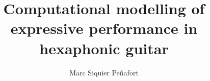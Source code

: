 




\title{Computational modelling of expressive performance in hexaphonic guitar}
\author{Marc Siquier Peñafort}

\maketitle
\maketitle
\restoregeometry
\sloppy





\preface
\body











\cleardoublepage



